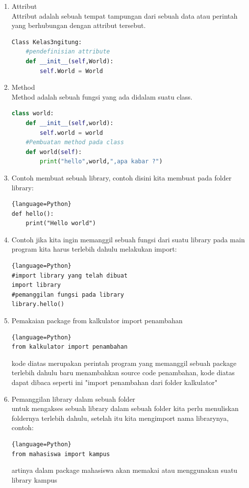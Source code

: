 \documentclass[a4paper, 12pt]{article}
\begin{document}
\begin{enumerate}
			\item Attribut\\
			Attribut adalah sebuah tempat tampungan dari sebuah data atau perintah yang berhubungan dengan attribut tersebut.
			\begin{lstlisting}[language=Python]
Class Kelas3ngitung:
	#pendefinisian attribute
    def __init__(self,World):
        self.World = World
			\end{lstlisting}
			
			\item Method\\
			Method adalah sebuah fungsi yang ada didalam suatu class.
			\begin{lstlisting}[language=Python]
class world:
    def __init__(self,world):
        self.world = world
    #Pembuatan method pada class
    def world(self):
       	print("hello",world,",apa kabar ?")
			\end{lstlisting}
			
			\newpage \item Contoh membuat sebuah library, contoh disini kita membuat pada folder library:
			\begin{lstlisting}{language=Python}
def hello():
    print("Hello world")
			\end{lstlisting}

			\item Contoh jika kita ingin memanggil sebuah fungsi dari suatu library pada main program kita harus terlebih dahulu melakukan import:
			\begin{lstlisting}{language=Python}
#import library yang telah dibuat
import library
#pemanggilan fungsi pada library
library.hello()
			\end{lstlisting}
			
			\item Pemakaian package from kalkulator import penambahan
			\begin{lstlisting}{language=Python}
from kalkulator import penambahan
			\end{lstlisting}
kode diatas merupakan perintah program yang memanggil sebuah package terlebih dahulu baru menambahkan source code penambahan, kode diatas dapat dibaca seperti ini "import penambahan dari folder kalkulator"

			\item Pemanggilan library dalam sebuah folder\\
			untuk mengakses sebuah library dalam sebuah folder kita perlu menuliskan foldernya terlebih dahulu, setelah itu kita mengimport nama librarynya, contoh:
			\begin{lstlisting}{language=Python}
from mahasiswa import kampus
			\end{lstlisting}
artinya dalam package mahasiswa akan memakai atau menggunakan suatu library kampus


\end{enumerate}
\end{document}
